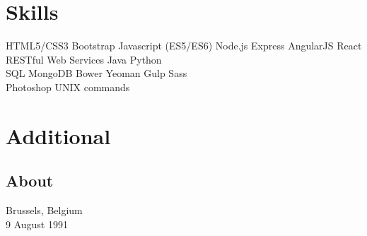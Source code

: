 \documentclass[letterpaper]{my-resume} %
\begin{document}
\begin{minipage}[t]{0.33\textwidth}
\sectionspace %


\section{Skills}

HTML5/CSS3 \textbullet{} Bootstrap \textbullet{} Javascript (ES5/ES6) \textbullet{} Node.js \textbullet{} Express \textbullet{} AngularJS \textbullet{} React \textbullet{} RESTful Web Services \textbullet{} Java \textbullet{} Python \\
SQL \textbullet{} MongoDB \textbullet{} Bower \textbullet{} Yeoman \textbullet{} Gulp \textbullet{} Sass \\
Photoshop \textbullet{} UNIX commands


\sectionspace %


\section{Additional}

\subsection{About}

Brussels, Belgium \\
9 August 1991 


\end{minipage}
\end{document}
